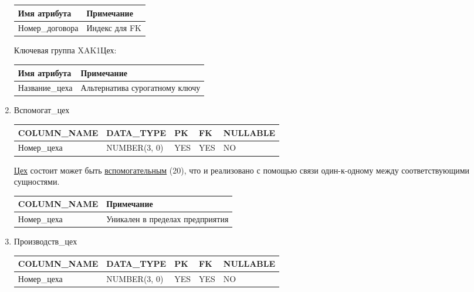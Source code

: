 \begin{enumerate}
    \begin{tabular}{|p{4cm}|p{5cm}|} \hline

        {\bf Имя атрибута} & {\bf Примечание} \\ \hline
        Номер\_договора & Индекс для FK \\ \hline

    \end{tabular}

    Ключевая группа XAK1Цех:

    \begin{tabular}{|p{4cm}|p{5cm}|} \hline

        {\bf Имя атрибута} & {\bf Примечание} \\ \hline
        Название\_цеха & Альтернатива сурогатному ключу \\ \hline

    \end{tabular}

    \item{Вспомогат\_цех}

    \begin{tabular}{|p{4cm}|p{3cm}|p{1cm}|p{1cm}|p{2cm}|} \hline

        {\bf COLUMN\_NAME} & {\bf DATA\_TYPE} & {\bf PK} & {\bf FK} & {\bf NULLABLE} \\ \hline
        Номер\_цеха & NUMBER(3, 0) & YES & YES & NO \\ \hline

    \end{tabular}

   \underline{Цех} состоит может быть \underline{вспомогательным} (20), что и реализовано с помощью связи один-к-одному между соответствующими сущностями.

    \begin{tabular}{|p{4cm}|p{5cm}|} \hline

        {\bf COLUMN\_NAME} & {\bf Примечание} \\ \hline
        Номер\_цеха & Уникален в пределах предприятия \\ \hline

    \end{tabular}

    \item{Производств\_цех}

    \begin{tabular}{|p{4cm}|p{3cm}|p{1cm}|p{1cm}|p{2cm}|} \hline

        {\bf COLUMN\_NAME} & {\bf DATA\_TYPE} & {\bf PK} & {\bf FK} & {\bf NULLABLE} \\ \hline
        Номер\_цеха & NUMBER(3, 0) & YES & YES & NO \\ \hline


\end{tabular}
\end{enumerate}

